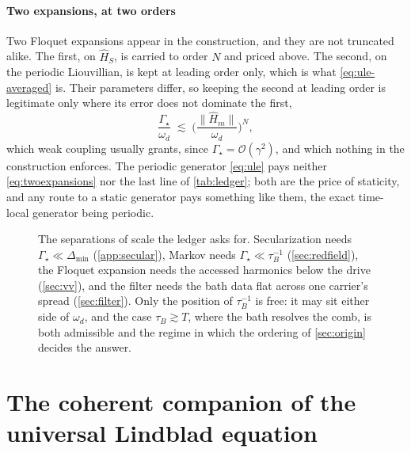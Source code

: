 \documentclass[a4paper,11pt]{article}
\begin{document}
\paragraph{Two expansions, at two orders}
Two Floquet expansions appear in the construction, and they are not truncated alike. The first, on $\hat H_S$, is carried to order $N$ and priced above. The second, on the periodic Liouvillian, is kept at leading order only, which is what \eqref{eq:ule-averaged} is. Their parameters differ, so keeping the second at leading order is legitimate only where its error does not dominate the first,
\begin{equation}\label{eq:twoexpansions}
  \frac{\Gamma_{\!\star}}{\omega_d}\;\lesssim\;\Big(\frac{\lVert\hat H_m\rVert}{\omega_d}\Big)^{\!N},
\end{equation}
which weak coupling usually grants, since $\Gamma_{\!\star} = \mathcal O(\gamma^2)$, and which nothing in the construction enforces. The periodic generator \eqref{eq:ule} pays neither \eqref{eq:twoexpansions} nor the last line of \cref{tab:ledger}; both are the price of staticity, and any route to a static generator pays something like them, the exact time-local generator being periodic.

\begin{figure}[t]
  \centering
  
  \caption{The separations of scale the ledger asks for. Secularization needs $\Gamma_{\!\star}\ll\Delta_{\min}$ (\cref{app:secular}), Markov needs $\Gamma_{\!\star}\ll\tau_B^{-1}$ (\cref{sec:redfield}), the Floquet expansion needs the accessed harmonics below the drive (\cref{sec:vv}), and the filter needs the bath data flat across one carrier's spread (\cref{sec:filter}). Only the position of $\tau_B^{-1}$ is free: it may sit either side of $\omega_d$, and the case $\tau_B\gtrsim T$, where the bath resolves the comb, is both admissible and the regime in which the ordering of \cref{sec:origin} decides the answer.}
  \label{fig:scales}
\end{figure}
\newpage
\appendix
\section{The coherent companion of the universal Lindblad equation}\label{app:lamb}
\end{document}
